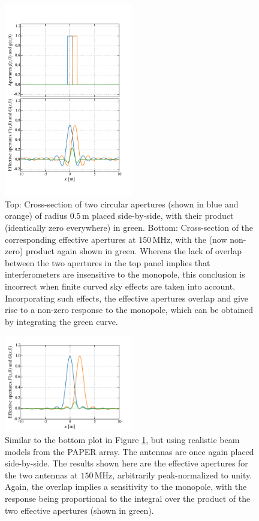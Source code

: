 \documentclass[twocolumn,apj,numberedappendix]{emulateapj}
\begin{document}
\begin{figure}[t]
	\centering
	\includegraphics[width=0.50\textwidth] {figures/effAperture.pdf}
	\caption{Top: Cross-section of two circular apertures (shown in blue and orange) of radius $0.5\,\textrm{m}$ placed
	side-by-side, with their product (identically zero everywhere) in green. Bottom: Cross-section of the corresponding effective apertures at $150\,\textrm{MHz}$, with the (now non-zero) product again shown in green.
	Whereas the lack of overlap between the two apertures in the top panel implies that
	interferometers are insensitive to the monopole, this conclusion is incorrect when finite
	curved sky effects are taken into account. Incorporating such effects, the effective
	apertures overlap and give rise to a non-zero response to the monopole, which can be obtained by integrating the green curve.}
	\label{fig:effAperture}
\end{figure}

\begin{figure}[h]
	\centering
	\includegraphics[width=0.50\textwidth] {figures/effAperture_PAPER.pdf}
	\caption{Similar to the bottom plot in Figure \ref{fig:effAperture}, but using realistic beam models from the PAPER array. The antennas are once again placed side-by-side. The results shown here are the effective apertures for the two antennas at $150\,\textrm{MHz}$, arbitrarily peak-normalized to unity. Again, the overlap implies a sensitivity to the monopole, with the response being proportional to the integral over the product of the two effective apertures (shown in green).}
	\label{fig:effAperture_PAPER}
\end{figure}
\end{document}
